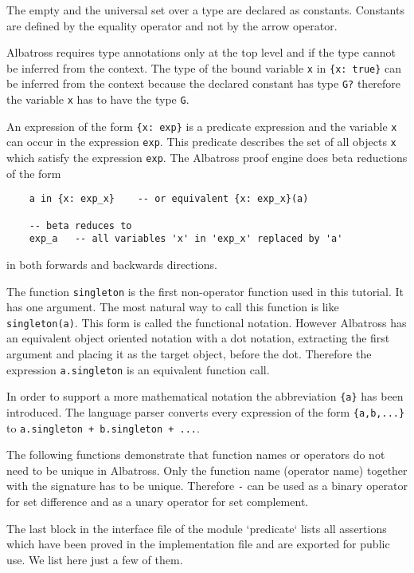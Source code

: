 The empty and the universal set over a type are declared as
constants. Constants are defined by the equality operator and not by the arrow
operator.

Albatross requires type annotations only at the top level and if the type
cannot be inferred from the context. The type of the bound variable
\lstinline!x! in \lstinline!{x: true}! can be inferred from the context
because the declared constant has type \lstinline!G?! therefore the variable
\lstinline!x! has to have the type \lstinline!G!.

An expression of the form \lstinline!{x: exp}! is a predicate expression and
the variable \lstinline!x! can occur in the expression \lstinline!exp!. This
predicate describes the set of all objects \lstinline!x! which satisfy the
expression \lstinline!exp!. The Albatross proof engine does beta reductions of
the form
\begin{lstlisting}
    a in {x: exp_x}    -- or equivalent {x: exp_x}(a)

    -- beta reduces to
    exp_a   -- all variables 'x' in 'exp_x' replaced by 'a'
\end{lstlisting}
in both forwards and backwards directions.

The function \lstinline!singleton! is the first non-operator function used in
this tutorial. It has one argument. The most natural way to call this function
is like \lstinline!singleton(a)!. This form is called the functional
notation. However Albatross has an equivalent object oriented notation with a
dot notation, extracting the first argument and placing it as the target object,
before the dot. Therefore the expression \lstinline!a.singleton! is an
equivalent function call.

In order to support a more mathematical notation the abbreviation
\lstinline!{a}! has been introduced. The language parser converts every
expression of the form \lstinline!{a,b,...}! to
\lstinline!a.singleton + b.singleton + ...!.

The following functions demonstrate that function names or operators do not
need to be unique in Albatross. Only the function name (operator name)
together with the signature has to be unique. Therefore \lstinline!-! can be
used as a binary operator for set difference and as a unary operator for set
complement.

The last block in the interface file of the module `predicate` lists all
assertions which have been proved in the implementation file and are exported
for public use. We list here just a few of them.

